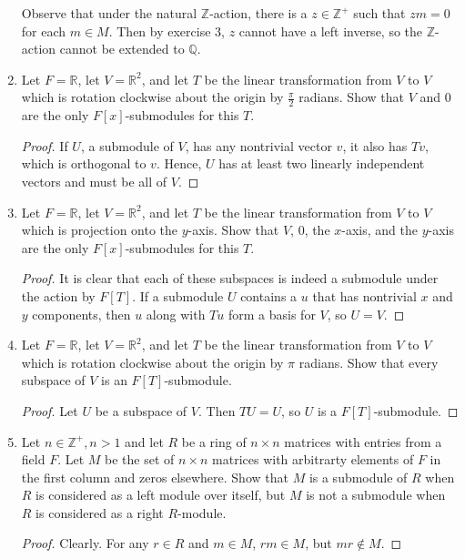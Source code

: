 \documentclass{report}
\newcommand{\Z}{\mathbb{Z}}
\newcommand{\Q}{\mathbb{Q}}
\newcommand{\R}{\mathbb{R}}
\begin{document}
\begin{enumerate}
		Observe that under the natural $\Z$-action, there is a $z\in \Z^+$ such that $zm=0$ for each $m\in M$. Then by exercise 3, $z$ cannot have a left inverse, so the $\Z$-action cannot be extended to $\Q$.
	\setcounter{enumi}{17}
	\item Let $F=\R$, let $V=\R^2$, and let $T$ be the linear transformation from $V$ to $V$ which is rotation clockwise about the origin by $\frac{\pi}{2}$ radians.
		Show that $V$ and $0$ are the only $F[x]$-submodules for this $T$.
		\begin{proof}
			If $U$, a submodule of $V$, has any nontrivial vector $v$, it also has $Tv$, which is orthogonal to $v$. Hence, $U$ has at least two linearly independent vectors and must be all of $V$.
		\end{proof}
	\item Let $F=\R$, let $V=\R^2$, and let $T$ be the linear transformation from $V$ to $V$ which is projection onto the $y$-axis.
		Show that $V$, $0$, the $x$-axis, and the $y$-axis are the only $F[x]$-submodules for this $T$.
		\begin{proof}
			It is clear that each of these subspaces is indeed a submodule under the action by $F[T]$. 
			If a submodule $U$ contains a $u$ that has nontrivial $x$ and $y$ components, then $u$ along with $Tu$ form a basis for $V$, so $U=V$.
		\end{proof}
	\item Let $F=\R$, let $V=\R^2$, and let $T$ be the linear transformation from $V$ to $V$ which is rotation clockwise about the origin by $\pi$ radians.
		Show that every subspace of $V$ is an $F[T]$-submodule.
		\begin{proof}
			Let $U$ be a subspace of $V$. Then $TU=U$, so $U$ is a $F[T]$-submodule. 
		\end{proof}
	\item Let $n \in\Z^+, n>1$ and let $R$ be a ring of $n\times n$ matrices with entries from a field $F$.
		Let $M$ be the set of $n\times n$ matrices with arbitrarty elements of $F$ in the first column and zeros elsewhere. 
		Show that $M$ is a submodule of $R$ when $R$ is considered as a left module over itself, but $M$ is not a submodule when $R$ is considered as a right $R$-module.
		\begin{proof}
			Clearly. For any $r\in R$ and $m\in M$, $rm \in M$, but $mr\notin M$. 
		\end{proof}
\end{enumerate}
\end{document}
